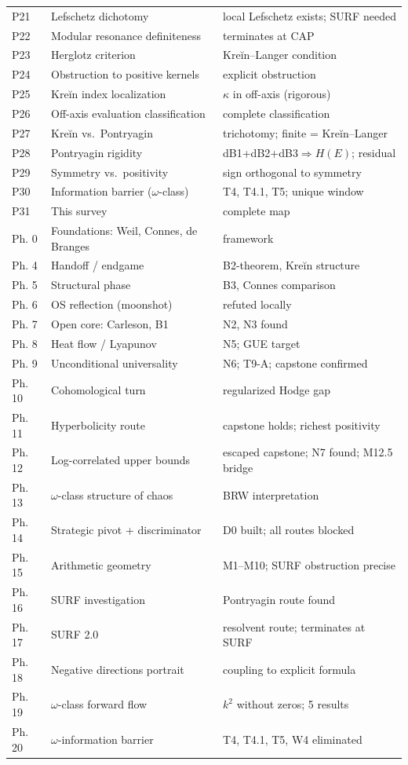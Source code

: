 \documentclass[11pt]{amsart}
\theoremstyle{definition}
\theoremstyle{remark}
\newcommand{\om}{\omega}
\newcommand{\kap}{\kappa}
\begin{document}
\begin{longtable}{lll}
P21 & Lefschetz dichotomy & local Lefschetz exists; SURF needed \\
P22 & Modular resonance definiteness & terminates at CAP \\
P23 & Herglotz criterion & Kreĭn--Langer condition \\
P24 & Obstruction to positive kernels & explicit obstruction \\
P25 & Kreĭn index localization & $\kap$ in off-axis (rigorous) \\
P26 & Off-axis evaluation classification & complete classification \\
P27 & Kreĭn vs.\ Pontryagin & trichotomy; finite = Kreĭn--Langer \\
P28 & Pontryagin rigidity & dB1+dB2+dB3$\Rightarrow H(E)$; residual \\
P29 & Symmetry vs.\ positivity & sign orthogonal to symmetry \\
P30 & Information barrier ($\om$-class) & T4, T4.1, T5; unique window \\
P31 & This survey & complete map \\
Ph. 0 & Foundations: Weil, Connes, de Branges & framework \\
Ph. 4 & Handoff / endgame & B2-theorem, Kreĭn structure \\
Ph. 5 & Structural phase & B3, Connes comparison \\
Ph. 6 & OS reflection (moonshot) & refuted locally \\
Ph. 7 & Open core: Carleson, B1 & N2, N3 found \\
Ph. 8 & Heat flow / Lyapunov & N5; GUE target \\
Ph. 9 & Unconditional universality & N6; T9-A; capstone confirmed \\
Ph. 10 & Cohomological turn & regularized Hodge gap \\
Ph. 11 & Hyperbolicity route & capstone holds; richest positivity \\
Ph. 12 & Log-correlated upper bounds & escaped capstone; N7 found; M12.5 bridge \\
Ph. 13 & $\om$-class structure of chaos & BRW interpretation \\
Ph. 14 & Strategic pivot + discriminator & D0 built; all routes blocked \\
Ph. 15 & Arithmetic geometry & M1--M10; SURF obstruction precise \\
Ph. 16 & SURF investigation & Pontryagin route found \\
Ph. 17 & SURF 2.0 & resolvent route; terminates at SURF \\
Ph. 18 & Negative directions portrait & coupling to explicit formula \\
Ph. 19 & $\om$-class forward flow & $k^2$ without zeros; 5 results \\
Ph. 20 & $\om$-information barrier & T4, T4.1, T5, W4 eliminated \\
\end{longtable}
\end{document}
